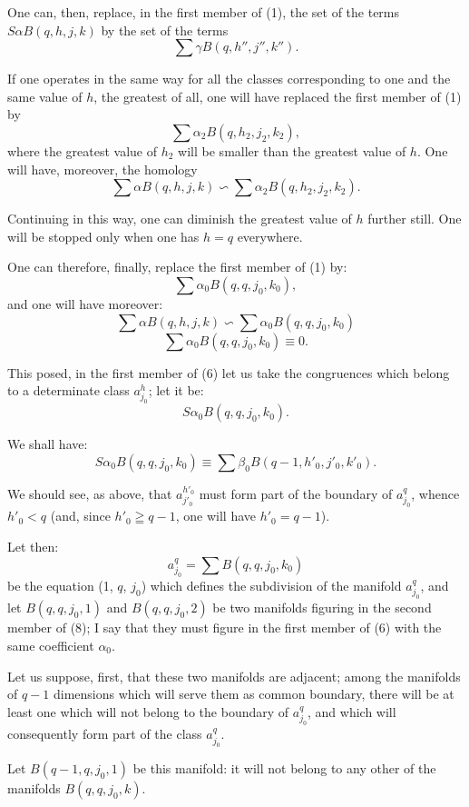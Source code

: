 \documentclass{article}
\begin{document}
One can, then, replace, in the first member of (1), the set of the terms $S \alpha B(q, h, j, k)$ by the set of the terms
\[ \sum \gamma B(q, h'', j'', k''). \]

If one operates in the same way for all the classes corresponding to one and the same value of $h$, the greatest of all, one will have replaced the first member of (1) by
\[ \sum \alpha_{2} B(q, h_{2}, j_{2}, k_{2}), \]
where the greatest value of $h_{2}$ will be smaller than the greatest value of $h$. One will have, moreover, the homology
\[ \sum \alpha B(q, h, j, k) \backsim \sum \alpha_{2} B(q, h_{2}, j_{2}, k_{2}). \]

Continuing in this way, one can diminish the greatest value of $h$ further still. One will be stopped only when one has $h = q$ everywhere.

One can therefore, finally, replace the first member of (1) by:
\[ \sum \alpha_{0} B(q, q, j_{0}, k_{0}), \]
and one will have moreover:
\[ \sum \alpha B(q, h, j, k) \backsim \sum \alpha_{0} B(q, q, j_{0}, k_{0}) \tag{5} \]
\[ \sum \alpha_{0} B(q, q, j_{0}, k_{0}) \equiv 0. \tag{6} \]

This posed, in the first member of (6) let us take the congruences which belong to a determinate class $a^{h}_{j_{0}}$; let it be:
\[ S \alpha_{0} B(q, q, j_{0}, k_{0}). \]

We shall have:
\[ S \alpha_{0} B(q, q, j_{0}, k_{0}) \equiv \sum \beta_{0} B(q - 1, h'_{0}, j'_{0}, k'_{0}). \tag{7} \]

We should see, as above, that $a^{h'_{0}}_{j'_{0}}$ must form part of the boundary of $a^{q}_{j_{0}}$, whence $h'_{0} < q$ (and, since $h'_{0} \geqq q - 1$, one will have $h'_{0} = q - 1$).

Let then:
\[ a^{q}_{j_{0}} = \sum B(q, q, j_{0}, k_{0}) \tag{8} \]
be the equation (1, $q$, $j_{0}$) which defines the subdivision of the manifold $a^{q}_{j_{0}}$, and let $B(q, q, j_{0}, 1)$ and $B(q, q, j_{0}, 2)$ be two manifolds figuring in the second member of (8); I say that they must figure in the first member of (6) with the same coefficient $\alpha_{0}$.

Let us suppose, first, that these two manifolds are adjacent; among the manifolds of $q - 1$ dimensions which will serve them as common boundary, there will be at least one which will not belong to the boundary of $a^{q}_{j_{0}}$, and which will consequently form part of the class $a^{q}_{j_{0}}$.

Let $B(q - 1, q, j_{0}, 1)$ be this manifold: it will not belong to any other of the manifolds $B(q, q, j_{0}, k)$.
\end{document}
